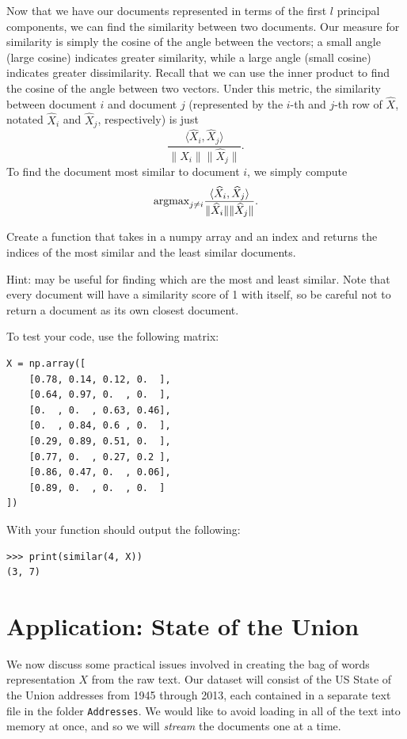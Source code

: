Now that we have our documents represented in terms of the first $l$ principal components, we can find the similarity between two documents.
Our measure for similarity is simply the cosine of the angle between the vectors; a small angle (large cosine) indicates greater similarity, while a large angle (small cosine) indicates greater dissimilarity.
Recall that we can use the inner product to find the cosine of the angle between two vectors.
Under this metric, the similarity between document $i$ and document $j$ (represented by the $i$-th and $j$-th row of $\widehat{X}$, notated $\widehat{X}_i$ and $\widehat{X}_j$, respectively) is just
\[
\frac{\langle \widehat{X}_i, \widehat{X}_j\rangle}{\|\widehat{X}_i\|\|\widehat{X}_j\|}.
\]
To find the document most similar to document $i$, we simply compute
\[
\mbox{argmax}_{j\neq i} \frac{\langle \widehat{X}_i, \widehat{X}_j\rangle}{\|\widehat{X}_i\|\|\widehat{X}_j\|}.
\]

\begin{problem} %
Create a function  that takes in a numpy array  and an index  and returns the indices of the most similar and the least similar documents.

Hint:  may be useful for finding which are the most and least similar.
Note that every document will have a similarity score of 1 with itself, so be careful not to return a document as its own closest document.

To test your code, use the following matrix:
\begin{lstlisting}
X = np.array([
    [0.78, 0.14, 0.12, 0.  ],
    [0.64, 0.97, 0.  , 0.  ],
    [0.  , 0.  , 0.63, 0.46],
    [0.  , 0.84, 0.6 , 0.  ],
    [0.29, 0.89, 0.51, 0.  ],
    [0.77, 0.  , 0.27, 0.2 ],
    [0.86, 0.47, 0.  , 0.06],
    [0.89, 0.  , 0.  , 0.  ]
]) 
\end{lstlisting}
With  your function should output the following:
\begin{lstlisting}
>>> print(similar(4, X))
(3, 7)
\end{lstlisting}
\end{problem}

\section*{Application: State of the Union} 
We now discuss some practical issues involved in creating the bag of words representation $X$ from the raw text.
Our dataset will consist of the US State of the Union addresses from 1945 through 2013, each contained in a separate text file in the folder {\tt Addresses}.
We would like to avoid loading in all of the text into memory at once, and so we will \emph{stream} the documents one at a time.

